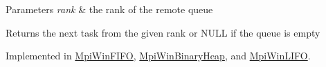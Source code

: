 \begin{DoxyParams}{Parameters}
{\em rank} & the rank of the remote queue\\
\hline
\end{DoxyParams}
\begin{DoxyReturn}{Returns}
the next task from the given rank or N\+U\+L\+L if the queue is empty 
\end{DoxyReturn}


Implemented in \hyperlink{a00056_a8f4af1f3c3f90b939f3638bf321be3bf}{Mpi\+Win\+F\+I\+F\+O}, \hyperlink{a00055_a713a9f45479e2b80a880867bbb003b8d}{Mpi\+Win\+Binary\+Heap}, and \hyperlink{a00057_a0631b1fc2042f19a5b438c8cfa44934a}{Mpi\+Win\+L\+I\+F\+O}.

